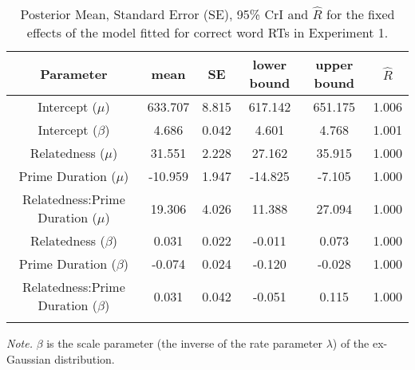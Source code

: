 \documentclass[
  english,
  man,floatsintext]{apa6}
\begin{document}
\begin{table}[H]

\begin{center}
\begin{threeparttable}

\caption{\label{tab:exp1-blmm-table}Posterior Mean, Standard Error (SE), 95\% CrI and \(\hat{R}\) for the fixed effects of the model fitted for correct word RTs in Experiment 1.}

\small{

\begin{tabular}{cccccc}
\toprule
Parameter & \multicolumn{1}{c}{mean} & \multicolumn{1}{c}{SE} & \multicolumn{1}{c}{lower bound} & \multicolumn{1}{c}{upper bound} & \multicolumn{1}{c}{$\hat{R}$}\\
\midrule
Intercept ($\mu$) & 633.707 & 8.815 & 617.142 & 651.175 & 1.006\\
Intercept ($\beta$) & 4.686 & 0.042 & 4.601 & 4.768 & 1.001\\
Relatedness ($\mu$) & 31.551 & 2.228 & 27.162 & 35.915 & 1.000\\
Prime Duration ($\mu$) & -10.959 & 1.947 & -14.825 & -7.105 & 1.000\\
Relatedness:Prime Duration ($\mu$) & 19.306 & 4.026 & 11.388 & 27.094 & 1.000\\
Relatedness ($\beta$) & 0.031 & 0.022 & -0.011 & 0.073 & 1.000\\
Prime Duration ($\beta$) & -0.074 & 0.024 & -0.120 & -0.028 & 1.000\\
Relatedness:Prime Duration ($\beta$) & 0.031 & 0.042 & -0.051 & 0.115 & 1.000\\
\bottomrule
\addlinespace
\end{tabular}

}

\begin{tablenotes}[para]
\normalsize{\textit{Note.} $\beta$ is the scale parameter (the inverse of the rate parameter $\lambda$) of the ex-Gaussian distribution.}
\end{tablenotes}

\end{threeparttable}
\end{center}

\end{table}
\end{document}
